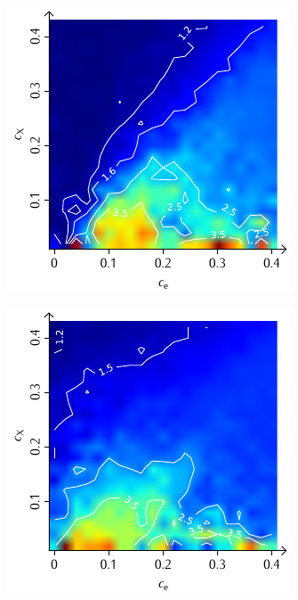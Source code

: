 \documentclass[a4paper, 10pt, twoside, openany]{book} %
\begin{document}
\begin{figure}
\begin{minipage}[t]{0.48\textwidth}
			\label{F_penalty_cluster_D}
		\end{minipage}
		\begin{minipage}[t]{0.48\textwidth}
			\includegraphics[width=\textwidth]{Abbildungen/Phasendiagramme/Konturen/F_random_D.pdf}
			\label{F_random_D}
		\end{minipage}
		\hfill
		\begin{minipage}[t]{0.48\textwidth}
			\includegraphics[width=\textwidth]{Abbildungen/Phasendiagramme/Konturen/F_penalty_random_D.pdf}

\end{minipage}
\end{figure}
\end{document}
